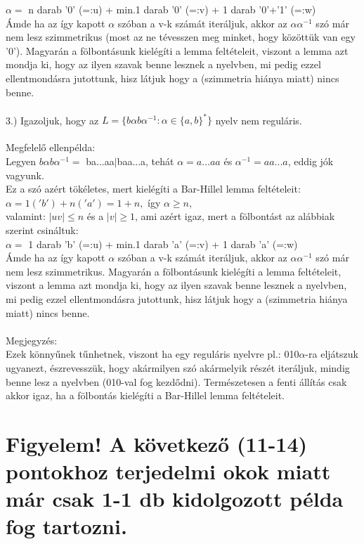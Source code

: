 \documentclass[12pt]{article}
\begin{document}
$\alpha=$ n darab '0' (=:u) + min.1 darab '0' (=:v) + 1 darab '0'+'1' (=:w)\\
Ámde ha az így kapott $\alpha$ szóban a v-k számát iteráljuk, akkor az $\alpha\alpha^{-1}$ szó már nem lesz
szimmetrikus (most az ne tévesszen meg minket, hogy közöttük van egy '0'). 
Magyarán a fölbontásunk kielégíti a lemma feltételeit, viszont a lemma azt mondja ki, hogy
az ilyen szavak benne lesznek a nyelvben, mi pedig ezzel ellentmondásra jutottunk, hisz látjuk hogy a
(szimmetria hiánya miatt) nincs benne.
\\\\
3.) Igazoljuk, hogy az $L=\{ b\alpha b\alpha^{-1}:\alpha\in\{a,b\}^* \}$ nyelv nem reguláris. \\\\
Megfelelő ellenpélda:\\
Legyen $b\alpha b\alpha^{-1}=$ ba...aa$|$baa...a, tehát $\alpha=a...aa$ és $\alpha^{-1}=aa...a$, 
eddig jók vagyunk.\\
Ez a szó azért tökéletes, mert kielégíti a Bar-Hillel lemma feltételeit:\\
$\alpha = 1('b')+n('a') = 1+n,$ így $\alpha \geq n$,\\
valamint: $|uv| \leq n$ és a $|v| \geq 1$, ami azért igaz, mert a fölbontást az alábbiak szerint csináltuk:\\
$\alpha=$ 1 darab 'b' (=:u) + min.1 darab 'a' (=:v) + 1 darab 'a' (=:w)\\
Ámde ha az így kapott $\alpha$ szóban a v-k számát iteráljuk, akkor az $\alpha\alpha^{-1}$ szó már nem lesz
szimmetrikus. Magyarán a fölbontásunk kielégíti a lemma feltételeit, viszont a lemma azt mondja ki, hogy
az ilyen szavak benne lesznek a nyelvben, mi pedig ezzel ellentmondásra jutottunk, hisz látjuk hogy a
(szimmetria hiánya miatt) nincs benne.
\\\\
Megjegyzés: \\
Ezek könnyűnek tűnhetnek, viszont ha egy reguláris nyelvre pl.: 010$\alpha$-ra eljátszuk ugyanezt, észrevesszük,
hogy akármilyen szó akármelyik részét iteráljuk, mindig benne lesz a nyelvben (010-val fog kezdődni).
Természetesen a fenti állítás csak akkor igaz, ha a fölbontás kielégíti a Bar-Hillel lemma feltételeit.\\

\section{Figyelem! A következő (11-14) pontokhoz terjedelmi okok miatt
már csak 1-1 db kidolgozott példa fog tartozni.}
\end{document}
